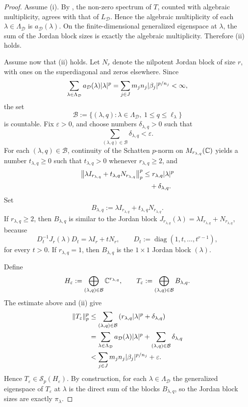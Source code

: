 \begin{proof}
  Assume \textup{(i)}. By , the
  non-zero spectrum of \(T\), counted with algebraic multiplicity,
  agrees with that of \(L_{\mathcal D}\). Hence the algebraic
  multiplicity of each \(\lambda\in\Lambda_{\mathcal D}\) is
  \(a_{\mathcal D}(\lambda)\). On the finite-dimensional generalized
  eigenspace at \(\lambda\), the sum of the Jordan block sizes is
  exactly the algebraic multiplicity. Therefore \textup{(ii)} holds.

  Assume now that \textup{(ii)} holds. Let \(N_r\) denote the nilpotent
  Jordan block of size \(r\), with ones on the superdiagonal and zeros
  elsewhere. Since
  \[
    \sum_{\lambda\in\Lambda_{\mathcal D}}
      a_{\mathcal D}(\lambda)\lvert \lambda \rvert^p
    =\sum_{j\in J}m_jn_j\lvert \beta_j \rvert^{p/n_j}
    <\infty,
  \]
  the set
  \[
    \mathcal B
    :=\{(\lambda,q):\lambda\in\Lambda_{\mathcal D},
      \ 1\le q\le \ell_\lambda\}
  \]
  is countable. Fix \(\varepsilon>0\), and choose numbers
  \(\delta_{\lambda,q}>0\) such that
  \[
    \sum_{(\lambda,q)\in\mathcal B}\delta_{\lambda,q}<\varepsilon.
  \]
  For each \((\lambda,q)\in\mathcal B\), continuity of the Schatten
  \(p\)-norm on \(M_{r_{\lambda,q}}(\mathbb{C})\) yields a number
  \(t_{\lambda,q}\ge 0\) such that \(t_{\lambda,q}>0\) whenever
  \(r_{\lambda,q}\ge 2\), and
  \[
    \begin{aligned}
      \left\|\lambda I_{r_{\lambda,q}}
        +t_{\lambda,q}N_{r_{\lambda,q}}\right\|_p^p
      &\le r_{\lambda,q}\lvert \lambda \rvert^p \\
      &\quad +\delta_{\lambda,q}.
    \end{aligned}
  \]
  Set
  \[
    B_{\lambda,q}
    :=\lambda I_{r_{\lambda,q}}+t_{\lambda,q}N_{r_{\lambda,q}}.
  \]
  If \(r_{\lambda,q}\ge 2\), then \(B_{\lambda,q}\) is similar to the
  Jordan block \(J_{r_{\lambda,q}}(\lambda)=\lambda I_{r_{\lambda,q}}
  +N_{r_{\lambda,q}}\), because
  \[
    D_t^{-1}J_r(\lambda)D_t=\lambda I_r+tN_r,
    \qquad
    D_t:=\operatorname{diag}(1,t,\dots,t^{r-1}),
  \]
  for every \(t>0\). If \(r_{\lambda,q}=1\), then \(B_{\lambda,q}\) is
  the \(1\times 1\) Jordan block \((\lambda)\).

  Define
  \[
    H_\varepsilon
    :=\bigoplus_{(\lambda,q)\in\mathcal B}\mathbb{C}^{r_{\lambda,q}},
    \qquad
    T_\varepsilon
    :=\bigoplus_{(\lambda,q)\in\mathcal B}B_{\lambda,q}.
  \]
  The estimate above and \textup{(ii)} give
  \begin{align*}
    \|T_\varepsilon\|_p^p
    &\le \sum_{(\lambda,q)\in\mathcal B}
      \left(r_{\lambda,q}\lvert \lambda \rvert^p+\delta_{\lambda,q}\right) \\
    &= \sum_{\lambda\in \Lambda_{\mathcal D}}
      a_{\mathcal D}(\lambda)\lvert \lambda \rvert^p
      +\sum_{(\lambda,q)\in\mathcal B}\delta_{\lambda,q} \\
    &< \sum_{j\in J}m_jn_j\lvert \beta_j \rvert^{p/n_j}+\varepsilon.
  \end{align*}
  Hence \(T_\varepsilon\in \mathcal S_p(H_\varepsilon)\). By
  construction, for each \(\lambda\in \Lambda_{\mathcal D}\) the
  generalized eigenspace of \(T_\varepsilon\) at \(\lambda\) is the
  direct sum of the blocks \(B_{\lambda,q}\), so the Jordan block sizes
  are exactly \(\pi_\lambda\).


\end{proof}
